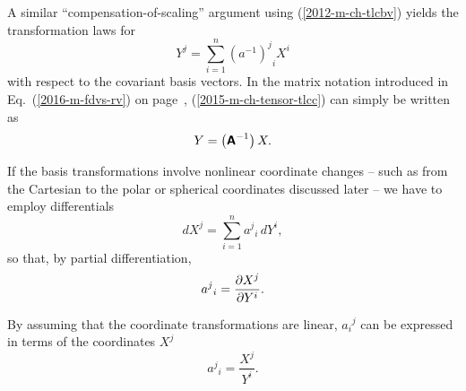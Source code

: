 A similar ``compensation-of-scaling'' argument using
(\ref{2012-m-ch-tlcbv})
yields the transformation laws for
\begin{equation}
{ Y }^j   = \sum_{i=1}^n {(a^{-1})^j}_i {X}^i
\label{2015-m-ch-tensor-tlcc}
\end{equation}
with respect to the covariant basis vectors.
In the matrix notation introduced in Eq.~(\ref{2016-m-fdvs-rv}) on page~\pageref{2016-m-fdvs-rv},
(\ref{2015-m-ch-tensor-tlcc}) can simply be written as
\begin{equation}
 Y    =  \left(\textsf{\textbf{A}}^{-1}\right) X.
\label{2016-m-ch-di-tlcc-mn}
\end{equation}


If the basis transformations involve nonlinear coordinate changes -- such as from the
Cartesian to the polar or spherical coordinates discussed later -- we have to employ differentials
\begin{equation}
dX^j   = \sum_{i=1}^n {a^j}_i \,d{ Y }^i  ,
\label{2012-m-ch-di-choic11}
\end{equation}
so that, by partial differentiation,
\begin{equation}
{a^j}_i ={\partial X^j \over \partial  Y ^i}   .
\label{2001-mu-tensor-tl11}
\end{equation}

By assuming that the coordinate transformations are linear, ${a_i}^j$ can be expressed in terms of the coordinates $X^j$
\begin{equation}
{a^j}_i =\frac{  X^j }{   Y ^i}  .
\label{2001-mu-tensor-tl1}
\end{equation}


